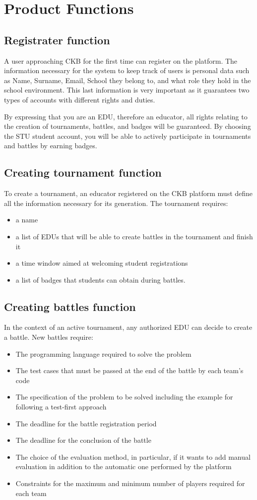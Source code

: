 \section{Product Functions}
\subsection{Registrater function}
A user approaching CKB for the first time can register on the platform.
The information necessary for the system to keep track of users is personal data such as Name, Surname, Email, School they belong to, and what role they hold in the school environment.
This last information is very important as it guarantees two types of accounts with different rights and duties.

By expressing that you are an EDU, therefore an educator, all rights relating to the creation of tournaments, battles, and badges will be guaranteed.
By choosing the STU student account, you will be able to actively participate in tournaments and battles by earning badges.

\subsection{Creating tournament function}
To create a tournament, an educator registered on the CKB platform must define all the information necessary for its generation.
The tournament requires:
\begin{itemize}
    \item a name
    \item a list of EDUs that will be able to create battles in the tournament and finish it
    \item a time window aimed at welcoming student registrations
    \item a list of badges that students can obtain during battles.
\end{itemize}

\subsection{Creating battles function}
In the context of an active tournament, any authorized EDU can decide to create a battle.
New battles require:
\begin{itemize}
    \item The programming language required to solve the problem
    \item The test cases that must be passed at the end of the battle by each team's code
    \item The specification of the problem to be solved including the example for following a test-first approach
    \item The deadline for the battle registration period
    \item The deadline for the conclusion of the battle
    \item The choice of the evaluation method, in particular, if it wants to add manual evaluation in addition to the automatic one performed by the platform
    \item Constraints for the maximum and minimum number of players required for each team
\end{itemize}

